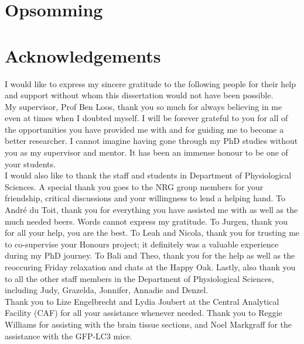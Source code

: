 \chapter{Opsomming}
\newpage

\chapter{Acknowledgements}

\noindent
I would like to express my sincere gratitude to the following people for their help and support without whom this dissertation would not
have been possible. \\

\noindent
My supervisor, Prof Ben Loos, thank you so much for always believing in me even at times when I doubted myself. I will be forever grateful to you for all of the opportunities you have provided me with and for guiding me to become a better researcher. I cannot imagine having gone through my PhD studies without you as my supervisor and mentor. It has been an immense honour to be one of your students. \\

\noindent
I would also like to thank the staff and students in Department of Physiological Sciences. A special thank you goes to the NRG group members for your friendship, critical discussions and your willingness to lend a helping hand. To Andr{\'e} du Toit, thank you for everything you have assisted me with as well as the much needed beers. Words cannot express my gratitude. To Jurgen, thank you for all your help, you are the best. To Leah and Nicola, thank you for trusting me to co-supervise your Honours project; it definitely was a valuable experience during my PhD journey. To Bali and Theo, thank you for the help as well as the reoccuring Friday relaxation and chats at the Happy Oak. Lastly, also thank you to all the other staff members in the Department of Physiological Sciences, including Judy, Grazelda, Jonnifer, Annadie and Denzel. \\

\noindent
Thank you to Lize Engelbrecht and Lydia Joubert at the Central Analytical Facility (CAF) for all your assistance whenever needed. Thank you to Reggie Williams for assisting with the brain tissue sections, and Noel Markgraff for the assistance with the GFP-LC3 mice. \\

